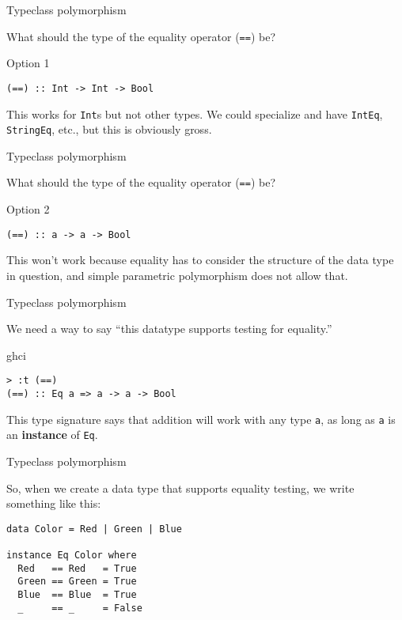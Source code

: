 %
\begin{frame}[fragile]{Typeclass polymorphism}

What should the type of the equality operator (\texttt{==}) be?

\begin{block}{Option 1}
\begin{verbatim}
(==) :: Int -> Int -> Bool
\end{verbatim}
\end{block}

This works for \texttt{Int}s but not other types. We could specialize and have
\texttt{IntEq}, \texttt{StringEq}, etc., but this is obviously gross.

\end{frame}

%
\begin{frame}[fragile]{Typeclass polymorphism}

What should the type of the equality operator (\texttt{==}) be?

\begin{block}{Option 2}
\begin{verbatim}
(==) :: a -> a -> Bool
\end{verbatim}
\end{block}

This won't work because equality has to consider the structure of the data type
in question, and simple parametric polymorphism does not allow that.

\end{frame}

%
\begin{frame}[fragile]{Typeclass polymorphism}

We need a way to say ``this datatype supports testing for equality.''

\begin{block}{ghci}
\begin{verbatim}
> :t (==)
(==) :: Eq a => a -> a -> Bool
\end{verbatim}
\end{block}

This type signature says that addition will work with any type \texttt{a}, as
long as \texttt{a} is an \textbf{instance} of \texttt{Eq}.

\end{frame}

%
\begin{frame}[fragile]{Typeclass polymorphism}

So, when we create a data type that supports equality testing, we write
something like this:

\begin{block}{}
\begin{verbatim}
data Color = Red | Green | Blue

instance Eq Color where
  Red   == Red   = True
  Green == Green = True
  Blue  == Blue  = True
  _     == _     = False
\end{verbatim}
\end{block}

\end{frame}

